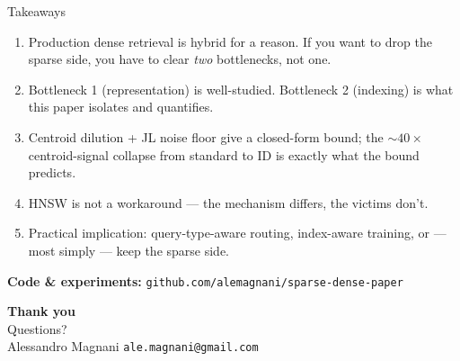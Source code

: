 \begin{frame}{Takeaways}
  \begin{enumerate}
    \item Production dense retrieval is hybrid for a reason. If you want to
          drop the sparse side, you have to clear \emph{two} bottlenecks, not one.
    \item Bottleneck 1 (representation) is well-studied. Bottleneck 2
          (indexing) is what this paper isolates and quantifies.
    \item Centroid dilution + JL noise floor give a closed-form bound; the
          $\sim 40\times$ centroid-signal collapse from standard to ID is
          exactly what the bound predicts.
    \item HNSW is not a workaround --- the mechanism differs, the victims
          don't.
    \item Practical implication: query-type-aware routing, index-aware
          training, or --- most simply --- keep the sparse side.
  \end{enumerate}

  \vfill
  \begin{center}
    \large
    \textbf{Code \& experiments:} \texttt{github.com/alemagnani/sparse-dense-paper}
  \end{center}
\end{frame}

\begin{frame}[plain]
  \begin{center}
    \vspace{2em}
    {\Huge \bfseries Thank you}\\[1em]
    {\large Questions?}\\[2em]

    \small Alessandro Magnani \;\textbar\; \texttt{ale.magnani@gmail.com}\\
    \confname \;\textbar\; \confvenue \;\textbar\; \confdate
  \end{center}
\end{frame}
